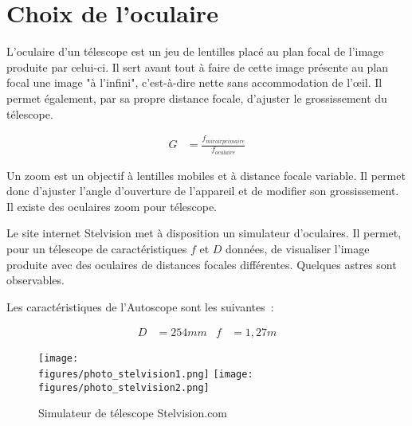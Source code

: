 \section{Choix de l'oculaire}

L'oculaire d'un télescope est un jeu de lentilles placé au plan focal de l'image produite par celui-ci. Il sert avant tout à faire de cette image présente au plan focal une image "à l'infini", c'est-à-dire nette sans accommodation de l'œil. Il permet également, par sa propre distance focale, d'ajuster le grossissement du télescope.

\begin{align*}
G&=\frac{f_{miroir primaire}}{f_{oculaire}}
\end{align*}

\vspace{1cm}

Un zoom est un objectif à lentilles mobiles et à distance focale variable. Il permet donc d'ajuster l'angle d'ouverture de l'appareil et de modifier son grossissement. Il existe des oculaires zoom pour télescope.

\vspace{1cm}

Le site internet Stelvision met à disposition un simulateur d'oculaires. Il permet, pour un télescope de caractéristiques $f$ et $D$ données, de visualiser l'image produite avec des oculaires de distances focales différentes. Quelques astres sont observables.

{\href{https://www.stelvision.com/simulateur-telescope/simulateur-telescope.php}{}}

\vspace{1cm}

Les caractéristiques de l'Autoscope sont les suivantes~:

\begin{align*}
D&=254mm&f&=1,27m
\end{align*}

\begin{figure}[H]
    \centering
    \texttt{[image: \\figures/photo\_stelvision1.png]}
    \texttt{[image: \\figures/photo\_stelvision2.png]}
    \decoRule
    \caption[
	Simulateur de télescope Stelvision.com]{
    Simulateur de télescope Stelvision.com}
    \label{fig:Simulateur de télescope Stelvision.com}
    \end{figure}

